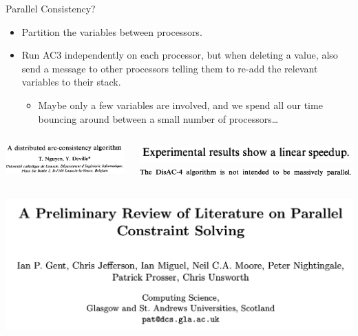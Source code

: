 \documentclass{beamer}
\begin{document}
\begin{frame}{Parallel Consistency?}

     {
        \begin{itemize}
            \item Partition the variables between processors.
            \item Run AC3 independently on each processor, but when deleting a value, also send a
                message to other processors telling them to re-add the relevant variables to their
                stack.

                \begin{itemize}
                    \item <2-> Maybe only a few variables are involved, and we spend all our time
                        bouncing around between a small number of processors\ldots
                \end{itemize}
        \end{itemize}
    }

     {
        \begin{columns}[T]
            \centering\includegraphics*[keepaspectratio=true,scale=0.12]{disac4-paper.png}

            \centering\includegraphics*[keepaspectratio=true,scale=0.12]{disac4-linear.png}
            \vspace{0.5em}
            \centering\includegraphics*[keepaspectratio=true,scale=0.12]{disac4-massive.png}
        \end{columns}

        \vspace{3em}

        \begin{columns}[T]
            \centering\includegraphics*[keepaspectratio=true,scale=0.12]{parallel-consistency-paper.png}


\end{columns}}
\end{frame}
\end{document}
